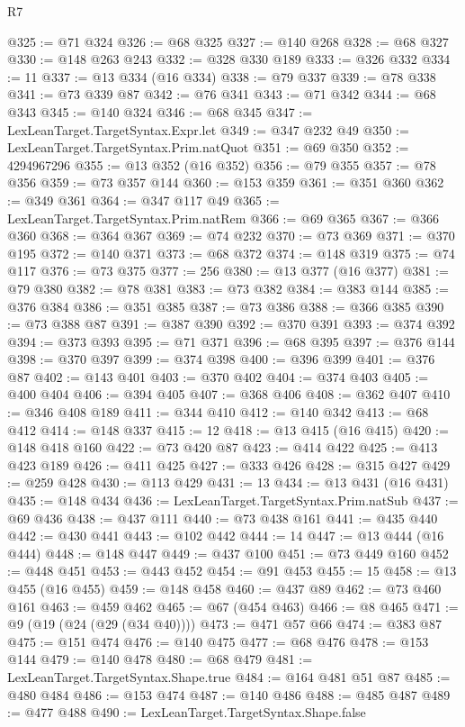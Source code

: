 \begin{lexlean}{R7}
\begin{coremodule}
@325 := @71 @324
@326 := @68 @325
@327 := @140 @268
@328 := @68 @327
@330 := @148 @263 @243
@332 := @328 @330 @189
@333 := @326 @332
@334 := 11
@337 := @13 @334 (@16 @334)
@338 := @79 @337
@339 := @78 @338
@341 := @73 @339 @87
@342 := @76 @341
@343 := @71 @342
@344 := @68 @343
@345 := @140 @324
@346 := @68 @345
@347 := LexLeanTarget.TargetSyntax.Expr.let
@349 := @347 @232 @49
@350 := LexLeanTarget.TargetSyntax.Prim.natQuot
@351 := @69 @350
@352 := 4294967296
@355 := @13 @352 (@16 @352)
@356 := @79 @355
@357 := @78 @356
@359 := @73 @357 @144
@360 := @153 @359
@361 := @351 @360
@362 := @349 @361
@364 := @347 @117 @49
@365 := LexLeanTarget.TargetSyntax.Prim.natRem
@366 := @69 @365
@367 := @366 @360
@368 := @364 @367
@369 := @74 @232
@370 := @73 @369
@371 := @370 @195
@372 := @140 @371
@373 := @68 @372
@374 := @148 @319
@375 := @74 @117
@376 := @73 @375
@377 := 256
@380 := @13 @377 (@16 @377)
@381 := @79 @380
@382 := @78 @381
@383 := @73 @382
@384 := @383 @144
@385 := @376 @384
@386 := @351 @385
@387 := @73 @386
@388 := @366 @385
@390 := @73 @388 @87
@391 := @387 @390
@392 := @370 @391
@393 := @374 @392
@394 := @373 @393
@395 := @71 @371
@396 := @68 @395
@397 := @376 @144
@398 := @370 @397
@399 := @374 @398
@400 := @396 @399
@401 := @376 @87
@402 := @143 @401
@403 := @370 @402
@404 := @374 @403
@405 := @400 @404
@406 := @394 @405
@407 := @368 @406
@408 := @362 @407
@410 := @346 @408 @189
@411 := @344 @410
@412 := @140 @342
@413 := @68 @412
@414 := @148 @337
@415 := 12
@418 := @13 @415 (@16 @415)
@420 := @148 @418 @160
@422 := @73 @420 @87
@423 := @414 @422
@425 := @413 @423 @189
@426 := @411 @425
@427 := @333 @426
@428 := @315 @427
@429 := @259 @428
@430 := @113 @429
@431 := 13
@434 := @13 @431 (@16 @431)
@435 := @148 @434
@436 := LexLeanTarget.TargetSyntax.Prim.natSub
@437 := @69 @436
@438 := @437 @111
@440 := @73 @438 @161
@441 := @435 @440
@442 := @430 @441
@443 := @102 @442
@444 := 14
@447 := @13 @444 (@16 @444)
@448 := @148 @447
@449 := @437 @100
@451 := @73 @449 @160
@452 := @448 @451
@453 := @443 @452
@454 := @91 @453
@455 := 15
@458 := @13 @455 (@16 @455)
@459 := @148 @458
@460 := @437 @89
@462 := @73 @460 @161
@463 := @459 @462
@465 := @67 (@454 @463)
@466 := @8 @465
@471 := @9 (@19 (@24 (@29 (@34 @40))))
@473 := @471 @57 @66
@474 := @383 @87
@475 := @151 @474
@476 := @140 @475
@477 := @68 @476
@478 := @153 @144
@479 := @140 @478
@480 := @68 @479
@481 := LexLeanTarget.TargetSyntax.Shape.true
@484 := @164 @481 @51 @87
@485 := @480 @484
@486 := @153 @474
@487 := @140 @486
@488 := @485 @487
@489 := @477 @488
@490 := LexLeanTarget.TargetSyntax.Shape.false

\end{coremodule}
\end{lexlean}
